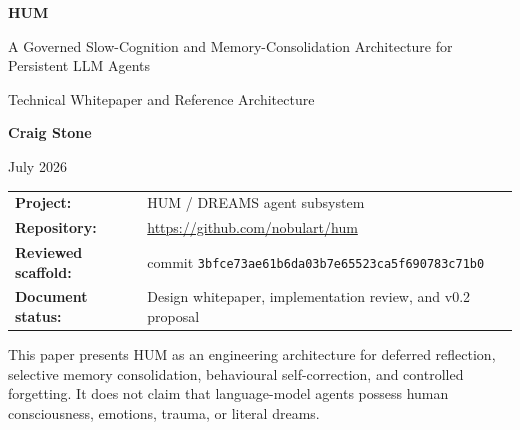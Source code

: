 \documentclass[11pt,a4paper]{article}
\newcommand{\repo}{\url{https://github.com/nobulart/hum}}
\begin{document}
\begin{titlepage}
\thispagestyle{empty}

\vspace*{22mm}
{\color{white}\fontsize{34}{39}\selectfont\bfseries HUM\par}
\vspace{3mm}
{\color{white}\fontsize{18}{23}\selectfont A Governed Slow-Cognition and Memory-Consolidation Architecture for Persistent LLM Agents\par}
\vspace{8mm}
{\color{white}\large Technical Whitepaper and Reference Architecture\par}

\vspace{55mm}
{\Large\bfseries Craig Stone\par}
\vspace{2mm}
{\large July 2026\par}
\vspace{10mm}
\begin{tabular}{@{}ll@{}}
\textbf{Project:} & HUM / DREAMS agent subsystem \\
\textbf{Repository:} & \repo \\
\textbf{Reviewed scaffold:} & commit \texttt{3bfce73ae61b6da03b7e65523ca5f690783c71b0} \\
\textbf{Document status:} & Design whitepaper, implementation review, and v0.2 proposal
\end{tabular}

\vfill
\begin{keybox}[Scope]
This paper presents HUM as an engineering architecture for deferred reflection, selective memory consolidation, behavioural self-correction, and controlled forgetting. It does not claim that language-model agents possess human consciousness, emotions, trauma, or literal dreams.
\end{keybox}
\end{titlepage}

\end{document}
